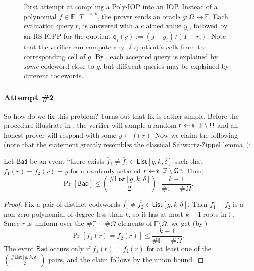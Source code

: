 \documentclass[../../book]{subfiles}
\begin{document}
\begin{figure}[h!]
{%
    }

    \caption{First attempt at compiling a Poly-IOP into an IOP. Instead of a polynomial $f \in \mathbb{F}[T]^{<k}$, the prover sends an oracle $g: \Omega \to \mathbb{F}$. Each evaluation query $r_i$ is answered with a claimed value $y_i$, followed by an RS-IOPP for the quotient $\mathsf{q}_i(g) := (g - y_i)/(T - r_i)$. Note that the verifier can compute any of quotient's cells from the corresponding cell of $g$. By , each accepted query is explained by \emph{some} codeword close to $g$, but different queries may be explained by different codewords.}
    \label{fig:poly-iop-first-attempt}
\end{figure}

\subsubsection{Attempt \#2}

So how do we fix this problem? Turns out that fix is rather simple.
Before the procedure illustrate in , the verifier will sample a random $r \leftarrowS \mathbb{F} \setminus \Omega$ and an honest prover will respond with some $y \gets f(r)$.
Now we claim the following (note that the statement greatly resembles the classical Schwartz-Zippel lemma~):

\begin{proposition}\label{prop:iopp-bad-event}
    Let $\mathsf{Bad}$ be an event ``there exists $\overline{f}_1 \neq \overline{f}_2 \in \mathsf{List}[g,k,\delta]$ such that $f_1(r) = f_2(r) = y$ for a randomly selected $r \leftarrowS \mathbb{F} \setminus \Omega$''.
    Then,
    \begin{equation*}
      \Pr\left[ \mathsf{Bad} \right] \leq \binom{\#\mathsf{List}[g,k,\delta]}{2} \cdot \frac{k-1}{\#\mathbb{F} - \#\Omega}.
    \end{equation*}
\end{proposition}

\begin{proof}
    Fix a pair of distinct codewords $\overline{f_1} \neq \overline{f_2} \in \mathsf{List}[g,k,\delta]$.
    Then $f_1 - f_2$ is a non-zero polynomial of degree less than $k$, so it has at most $k - 1$ roots in $\mathbb{F}$.
    Since $r$ is uniform over the $\#\mathbb{F} - \#\Omega$ elements of $\mathbb{F} \setminus \Omega$, we get (by )
    \begin{equation*}
        \Pr\left[ f_1(r) = f_2(r) \right] \leq \frac{k-1}{\#\mathbb{F} - \#\Omega}.
    \end{equation*}
    The event $\mathsf{Bad}$ occurs only if $f_1(r) = f_2(r)$ for at least one of the $\binom{\#\mathsf{List}[g,k,\delta]}{2}$ pairs, and the claim follows by the union bound.
\end{proof}
\end{document}
